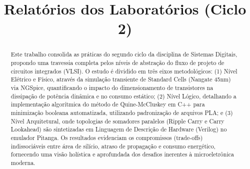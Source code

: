 \documentclass[conference]{IEEEtran}
\begin{document}
\title{Relatórios dos Laboratórios (Ciclo 2)}

\author{

\and


\and


\and 

}

\maketitle

\begin{abstract}
Este trabalho consolida as práticas do segundo ciclo da disciplina de Sistemas Digitais, propondo uma travessia completa pelos níveis de abstração do fluxo de projeto de circuitos integrados (VLSI). O estudo é dividido em três eixos metodológicos: (1) Nível Elétrico e Físico, através da simulação transiente de Standard Cells (Nangate 45nm) via NGSpice, quantificando o impacto do dimensionamento de transistores na dissipação de potência dinâmica e no consumo estático; (2) Nível Lógico, detalhando a implementação algorítmica do método de Quine-McCluskey em C++ para minimização booleana automatizada, utilizando padronização de arquivos PLA; e (3) Nível Arquitetural, onde topologias de somadores paralelos (Ripple Carry e Carry Lookahead) são sintetizadas em Linguagem de Descrição de Hardware (Verilog) no emulador Pitanga. Os resultados evidenciam os compromissos (trade-offs) indissociáveis entre área de silício, atraso de propagação e consumo energético, fornecendo uma visão holística e aprofundada dos desafios inerentes à microeletrônica moderna.
\end{abstract}
\end{document}
